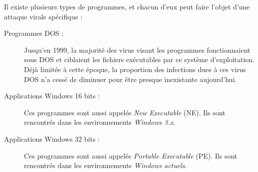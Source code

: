     Il existe plusieurs types de programmes, et chacun d'eux peut faire l'objet d'une attaque virale spécifique 
    \cite{virus_informatique_article} : %
    \begin{description}
        \item[Programmes DOS :] Jusqu’en 1999, la majorité des virus visant les programmes fonctionnaient sous 
            DOS et ciblaient les fichiers exécutables par ce système d'exploitation. 
            Déjà limitée à cette époque, la proportion des infections dues à ces virus DOS n’a cessé 
            de diminuer pour être presque inexistante aujourd’hui. %
        \item[Applications Windows 16 bits :] Ces programmes sont aussi appelés \emph{New Executable} (NE).
            Ils sont rencontrés dans les environnements \emph{Windows 3.x}. %
        \item[Applications Windows 32 bits :] Ces programmes sont aussi appelés \emph{Portable Executable}
            (PE). Ils sont rencontrés dans les environnements \emph{Windows actuels}.%
    \end{description}





